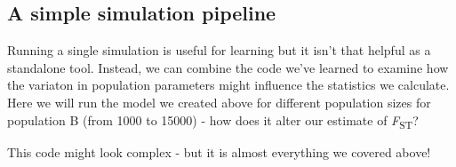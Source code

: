 \documentclass[
  letterpaper,
  DIV=11,
  numbers=noendperiod]{scrartcl}
\begin{document}
\hypertarget{a-simple-simulation-pipeline}{%
\subsection{A simple simulation
pipeline}\label{a-simple-simulation-pipeline}}

Running a single simulation is useful for learning but it isn't that
helpful as a standalone tool. Instead, we can combine the code we've
learned to examine how the variaton in population parameters might
influence the statistics we calculate. Here we will run the model we
created above for different population sizes for population B (from 1000
to 15000) - how does it alter our estimate of
\emph{F}\textsubscript{ST}?

This code might look complex - but it is almost everything we covered
above!
\end{document}

